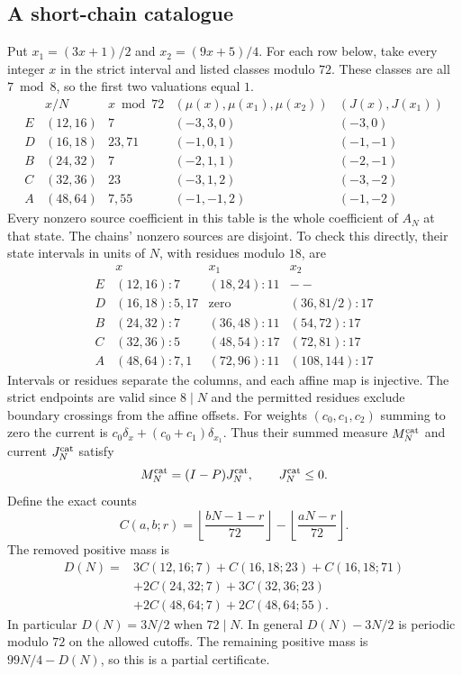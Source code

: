 \documentclass[11pt]{article}
\begin{document}
\subsection{A short-chain catalogue}
Put $x_1=(3x+1)/2$ and $x_2=(9x+5)/4$. For each row below, take every
integer $x$ in the strict interval and listed classes modulo $72$.
These classes are all $7\bmod8$, so the first two valuations equal $1$.
\[
\begin{array}{c|c|c|c|c}
 &x/N&x\bmod72&
 (\mu(x),\mu(x_1),\mu(x_2))&(J(x),J(x_1))\\ \hline
E&(12,16)&7&(-3,3,0)&(-3,0)\\
D&(16,18)&23,71&(-1,0,1)&(-1,-1)\\
B&(24,32)&7&(-2,1,1)&(-2,-1)\\
C&(32,36)&23&(-3,1,2)&(-3,-2)\\
A&(48,64)&7,55&(-1,-1,2)&(-1,-2)
\end{array}
\]
Every nonzero source coefficient in this table is the whole coefficient
of $A_N$ at that state. The chains' nonzero sources are disjoint.
To check this directly, their state intervals in units of $N$, with
residues modulo $18$, are
\[
\begin{array}{c|c|c|c}
 &x&x_1&x_2\\ \hline
E&(12,16):7&(18,24):11&--\\
D&(16,18):5,17&\text{zero}&(36,81/2):17\\
B&(24,32):7&(36,48):11&(54,72):17\\
C&(32,36):5&(48,54):17&(72,81):17\\
A&(48,64):7,1&(72,96):11&(108,144):17
\end{array}
\]
Intervals or residues separate the columns, and each affine map is
injective. The strict endpoints are valid since $8\mid N$ and the
permitted residues exclude boundary crossings from the affine offsets.
For weights $(c_0,c_1,c_2)$ summing to zero the current is
$c_0\delta_x+(c_0+c_1)\delta_{x_1}$. Thus their summed measure
$M_N^{\rm cat}$ and current $J_N^{\rm cat}$ satisfy
\[
M_N^{\rm cat}=(I-P)J_N^{\rm cat},\qquad J_N^{\rm cat}\le0.
\]
Define the exact counts
\[
C(a,b;r)=\left\lfloor\frac{bN-1-r}{72}\right\rfloor
          -\left\lfloor\frac{aN-r}{72}\right\rfloor .
\]
The removed positive mass is
\begin{align*}
D(N)={}&3C(12,16;7)+C(16,18;23)+C(16,18;71)\\
 &+2C(24,32;7)+3C(32,36;23)\\
 &+2C(48,64;7)+2C(48,64;55).
\end{align*}
In particular $D(N)=3N/2$ when $72\mid N$. In general
$D(N)-3N/2$ is periodic modulo $72$ on the allowed cutoffs. The remaining
positive mass is $99N/4-D(N)$, so this is a partial certificate.
\end{document}
